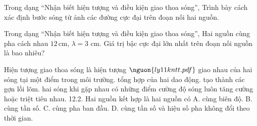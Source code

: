 \begin{ex}
Trong dạng “Nhận biết hiện tượng và điều kiện giao thoa sóng”, Trình bày cách xác định bước sóng từ ảnh các đường cực đại trên đoạn nối hai nguồn.
\choiceTF

\end{ex}

\begin{ex}
Trong dạng “Nhận biết hiện tượng và điều kiện giao thoa sóng”, Hai nguồn cùng pha cách nhau $12\,\text{cm}$, $\lambda=3$ cm. Giá trị bậc cực đại lớn nhất trên đoạn nối nguồn là bao nhiêu?
\end{ex}

\begin{ex}
Hiện tượng giao thoa sóng là hiện tượng $\nguon{ly11 kntt.pdf}$
\choice
{giao nhau của hai sóng tại một điểm trong môi trường.}
{tổng hợp của hai dao động.}
{tạo thành các gợn lồi lõm.}
{\True hai sóng khi gặp nhau có những điểm cường độ sóng luôn tăng cường hoặc triệt tiêu nhau. 12.2. Hai nguồn kết hợp là hai nguồn có A. cùng biên độ. B. cùng tần số. C. cùng pha ban đầu. D. cùng tần số và hiệu số pha không đổi theo thời gian.}
\end{ex}

